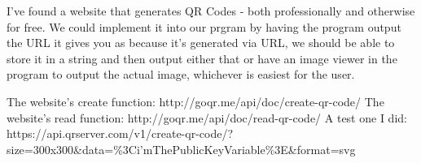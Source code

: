 I've found a website that generates QR Codes - both professionally and otherwise
for free.  We could implement it into our prgram by having the program output
the URL it gives you as because it's generated via URL, we should be able to
store it in a string and then output either that or have an image viewer in the
program to output the actual image, whichever is easiest for the user.

The website's create function: http://goqr.me/api/doc/create-qr-code/
The website's read function: http://goqr.me/api/doc/read-qr-code/
A test one I did:
https://api.qrserver.com/v1/create-qr-code/?size=300x300\&data=\%3Ci'mThePublicKeyVariable\%3E\&format=svg
